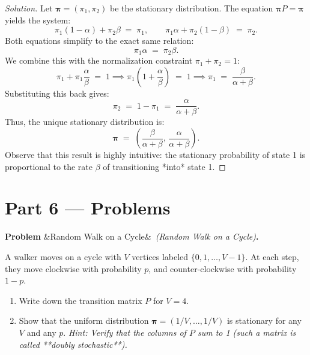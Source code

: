 \documentclass[12pt, a4paper]{article}
\newcounter{problem}
\newenvironment{problem}[1][]{%
  \refstepcounter{problem}%
  \par\vspace{6pt}%
  \noindent\textbf{\color{MidBlue}Problem \theproblem}%
  \ifx&#1&\else\ \textit{(#1)}\fi\textbf{.}\enskip
}{\par\vspace{4pt}}
\begin{document}
\begin{proof}[Solution]
Let $\boldsymbol{\pi} = (\pi_1, \pi_2)$ be the stationary distribution. The equation $\boldsymbol{\pi} P = \boldsymbol{\pi}$ yields the system:
\[
  \pi_1(1-\alpha) + \pi_2\beta \;=\; \pi_1, \qquad \pi_1\alpha + \pi_2(1-\beta) \;=\; \pi_2.
\]
Both equations simplify to the exact same relation:
\[
  \pi_1\alpha \;=\; \pi_2\beta.
\]
We combine this with the normalization constraint $\pi_1 + \pi_2 = 1$:
\[
  \pi_1 + \pi_1\frac{\alpha}{\beta} \;=\; 1 \implies \pi_1\left(1 + \frac{\alpha}{\beta}\right) \;=\; 1 \implies \pi_1 \;=\; \frac{\beta}{\alpha+\beta}.
\]
Substituting this back gives:
\[
  \pi_2 \;=\; 1 - \pi_1 \;=\; \frac{\alpha}{\alpha+\beta}.
\]
Thus, the unique stationary distribution is:
\[
  \boldsymbol{\pi} \;=\; \left( \frac{\beta}{\alpha+\beta}, \, \frac{\alpha}{\alpha+\beta} \right).
\]
Observe that this result is highly intuitive: the stationary probability of state 1 is proportional to the rate $\beta$ of transitioning *into* state 1.
\end{proof}

\newpage

\section{Part 6 \texorpdfstring{---}{--} Problems}

\begin{problem}[Random Walk on a Cycle]
A walker moves on a cycle with $V$ vertices labeled $\{0, 1, \dots, V-1\}$. At each step, they move clockwise with probability $p$, and counter-clockwise with probability $1-p$.
\begin{enumerate}[label=(\alph*)]
  \item Write down the transition matrix $P$ for $V = 4$.
  \item Show that the uniform distribution $\boldsymbol{\pi} = (1/V, \dots, 1/V)$ is stationary for any $V$ and any $p$. \textit{Hint: Verify that the columns of $P$ sum to 1 (such a matrix is called **doubly stochastic**).}
\end{enumerate}
\end{problem}
\end{document}
